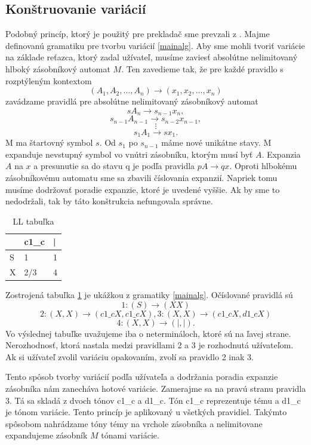 \subsection{Konštruovanie variácií}
Podobný princíp, ktorý je použitý pre prekladač sme prevzali z \cite{FITPUB10498}. Majme definovanú gramatiku pre tvorbu variácií \ref{mainalg}. Aby sme mohli tvoriť variácie na základe reťazca, ktorý zadal užívateľ, musíme zaviesť absolútne nelimitovaný hlboký zásobníkový automat $M$. Ten zavedieme tak, že pre každé pravidlo s rozptýleným kontextom $$(A_1, A_2, ..., A_n) \rightarrow (x_1, x_2, ..., x_n)$$ zavádzame pravidlá pre absolútne nelimitovaný zásobníkový automat $$sA_n \rightarrow s_{n-1}x_n,$$ $$s_{n-1}A_{n-1} \rightarrow s_{n-2}x_{n - 1},$$ $$\vdots$$ $$s_1A_1 \rightarrow sx_1.$$ M ma štartovný symbol $s$. Od $s_1$ po $s_{n - 1}$ máme nové unikátne stavy. M expanduje nevstupný symbol vo vnútri zásobníku, ktorým musí byť $A$. Expanzia $A$ na $x$ a presunutie sa do stavu q je podľa pravidla $pA \rightarrow qx$. Oproti hlbokému zásobníkovému automatu sme sa zbavili číslovania expanzií. Napriek tomu musíme dodržovať poradie expanzie, ktoré je uvedené vyššie. Ak by sme to nedodržali, tak by táto konštrukcia nefungovala správne.

\begin{table}[!ht]
\label{tabulLL}
\centering
\begin{tabular}{|l|l|l|}
\hline
  & c1\_c & | \\ \hline
S & 1     & 1 \\ \hline
X & 2/3   & 4\\ \hline
\end{tabular}
\caption{LL tabuľka}
\end{table}

Zostrojená tabuľka \ref{tabulLL} je ukážkou z gramatiky \ref{mainalg}. Očíslované pravidlá sú $$1: (S) \rightarrow (XX)$$$$2: (X,X) \rightarrow (c1\_cX, c1\_cX),3: (X,X) \rightarrow (c1\_cX, d1\_cX)$$$$4:(X,X) \rightarrow (|,|).$$ Vo výslednej tabuľke uvažujeme iba o netermináloch, ktoré sú na ľavej strane. Nerozhodnosť, ktorá nastala medzi pravidlami 2 a 3 je rozhodnutá užívateľom. Ak si užívateľ zvolil variáciu opakovaním, zvolí sa pravidlo 2 inak 3.

Tento spôsob tvorby variácií podľa užívateľa a dodržania poradia expanzie zásobníka nám zanecháva hotové variácie. Zamerajme sa na pravú stranu pravidla 3. Tá sa skladá z dvoch tónov c1\_c a d1\_c. Tón c1\_c reprezentuje tému a d1\_c je tónom variácie. Tento princíp je aplikovaný u všetkých pravidiel. Takýmto spôsobom nahrádzame tóny témy na vrchole zásobníka a nelimitovane expandujeme zásobník $M$ tónami variácie.

